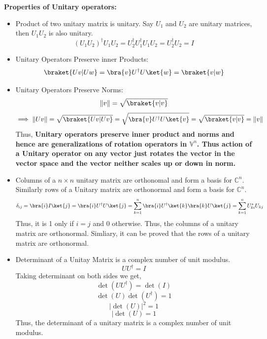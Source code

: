 \documentclass[12pt, oneside]{book}
\theoremstyle{definition}
\theoremstyle{definition}
\theoremstyle{remark}
\begin{document}
\textbf{Properties of Unitary operators: }
\begin{itemize}
    \item Product of two unitary matrix is unitary.
    Say $U_1$ and $U_2$ are unitary matrices, then $U_1U_2$ is also unitary.
    \[(U_1U_2)^{\dagger}U_1U_2=U_2^{\dagger}U_1^{\dagger}U_1U_2=U_2^{\dagger}U_2=I\]
    \item Unitary Operators Preserve inner Products:
    \[ \braket{Uv|Uw}=\bra{v}U^{\dagger}U\ket{w}=\braket{v|w} \]
    \item Unitary Operators Preserve Norms:
    \[ \|v\|=\sqrt{\braket{v|v}} \]
    \[ \implies \|Uv\|=\sqrt{\braket{Uv|Uv}}=\sqrt{\bra{v}U^{\dagger}U\ket{v}}=\sqrt{\braket{v|v}}=\|v\| \]
    Thus, \textbf{Unitary operators preserve inner product and norms and hence are generalizations of rotation operators in $\mathbb{V}^n$.
    Thus action of a Unitary operator on any vector just rotates the vector in the vector space and the vector neither scales up or down in norm.}
    \item Columns of a $n \times n$ unitary matrix are orthonomal and form a basis for $\mathbb{C}^n$.
    Similarly rows of a Unitary matrix are orthonormal and form a basis for $\mathbb{C}^n$.
    \[\delta_{ij}=\bra{i}I\ket{j}=\bra{i}U^{\dagger}U\ket{j}=\sum_{k=1}^n \bra{i}U^{\dagger}\ket{k}\bra{k}U\ket{j}=\sum_{k=1}^nU_{ki}^*U_{kj}\]
    Thus, it is 1 only if $i=j$ and 0 otherwise. Thus, the columns of a unitary matrix are orthonormal. Simliary, it can be 
    proved that the rows of a unitary matrix are orthonormal.
    \item Determinant of a Unitay Matrix is a complex number of unit modulus.
    \[ UU^{\dagger}=I\]
    Taking determinant on both sides we get,
    \[ \det(UU^{\dagger})=\det(I) \]
    \[ \det(U)\det(U^{\dagger})=1 \]
    \[ |\det(U)|^2=1\]
    \[ |\det(U) = 1 \]
    Thus, the determinant of a unitary matrix is a complex number of unit modulus.
\end{itemize}
\end{document}
